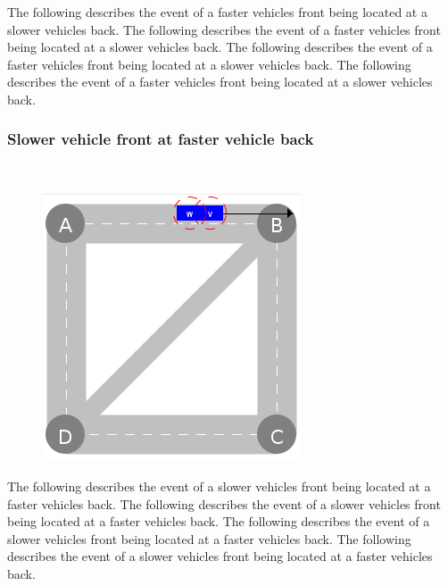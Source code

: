\documentclass[graybox]{svmult}
\begin{document}
The following describes the event of a faster vehicles front being located at a slower vehicles back.
The following describes the event of a faster vehicles front being located at a slower vehicles back.
The following describes the event of a faster vehicles front being located at a slower vehicles back.
The following describes the event of a faster vehicles front being located at a slower vehicles back.

\subsubsection{Slower vehicle front at faster vehicle back}
\
\begin{figure}
	\centering
	\includegraphics[scale=0.35]{../../events/slower-vehicle-front-at-faster-vehicle-back.png}
\end{figure}
The following describes the event of a slower vehicles front being located at a faster vehicles back.
The following describes the event of a slower vehicles front being located at a faster vehicles back.
The following describes the event of a slower vehicles front being located at a faster vehicles back.
The following describes the event of a slower vehicles front being located at a faster vehicles back.
\end{document}
